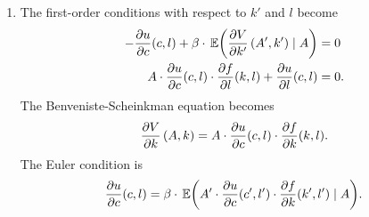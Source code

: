\documentclass[letterpaper,12pt,leqno]{article}
\begin{document}
\begin{enumerate}
\item The first-order conditions with respect to $k'$ and $l$ become
\begin{align*}
-\pd{u}{c}(c,l)+\b \cdot \E{\pd{V}{k'}\bp{A',k'}\mid A} &=0 \\
A\cdot \pd{u}{c}(c,l)\cdot \pd{f}{l}(k,l)+\pd{u}{l}(c,l)&=0.
\end{align*}
The Benveniste-Scheinkman equation becomes
\begin{align*}
\frac{\partial V}{\partial k}\left( A,k \right)=A\cdot \frac{\partial u}{\partial c}(c,l)\cdot \frac{\partial f}{\partial k}(k,l).
\end{align*}
The Euler condition is
\begin{align*}
\pd{u}{c}(c,l)=\b \cdot \E{A'\cdot \pd{u}{c}(c',l')\cdot \pd{f}{k}(k',l')\mid A}.
\end{align*}
\end{enumerate}
\end{document}
